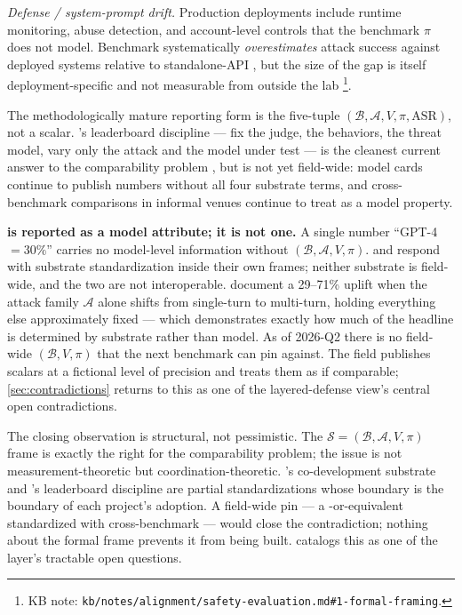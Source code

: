 \emph{Defense / system-prompt drift.} Production deployments include
runtime monitoring, abuse detection, and account-level controls
that the benchmark $\pi$ does not model. Benchmark  systematically
\emph{overestimates} attack success against deployed systems
relative to standalone-API , but the size of the gap is itself
deployment-specific and not measurable from outside the lab%
\footnote{KB note: \texttt{kb/notes/alignment/safety-evaluation.md\#1-formal-framing}.}.

The methodologically mature reporting form is the five-tuple
$(\mathcal{B}, \mathcal{A}, V, \pi, \mathrm{ASR})$, not a scalar.
's leaderboard discipline --- fix the judge, the
behaviors, the threat model, vary only the attack and the model
under test --- is the cleanest current answer to the comparability
problem
\citep[\S{}abstract]{chao2024-jailbreakbench}, but is not yet
field-wide: model cards continue to publish  numbers without
all four substrate terms, and cross-benchmark comparisons in
informal venues continue to treat  as a model property.

\begin{contradiction}
\textbf{ is reported as a model attribute; it is not one.}
A single number ``GPT-4  $= 30\%$'' carries no model-level
information without $(\mathcal{B}, \mathcal{A}, V, \pi)$.
\citet{harmbench2024} and \citet{chao2024-jailbreakbench} respond
with substrate standardization inside their own frames; neither
substrate is field-wide, and the two are not interoperable.
\citet{russinovich2024-crescendo} document a 29--71\% uplift when
the attack family $\mathcal{A}$ alone shifts from single-turn to
multi-turn, holding everything else approximately fixed --- which
demonstrates exactly how much of the headline  is determined by
substrate rather than model. As of 2026-Q2 there is no field-wide
$(\mathcal{B}, V, \pi)$ that the next benchmark can pin against.
The field publishes  scalars at a fictional level of precision
and treats them as if comparable; \cref{sec:contradictions} returns
to this as one of the layered-defense view's central open
contradictions.
\end{contradiction}

The closing observation is structural, not pessimistic. The
$\mathcal{S} = (\mathcal{B}, \mathcal{A}, V, \pi)$ frame is exactly
the right  for the comparability problem; the issue is
not measurement-theoretic but coordination-theoretic. 's
co-development substrate and 's leaderboard
discipline are partial standardizations whose boundary is the
boundary of each project's adoption. A field-wide pin --- a
-or-equivalent standardized  with cross-benchmark
 --- would close the contradiction; nothing about
the formal frame prevents it from being built. 
catalogs this as one of the layer's tractable open questions.

